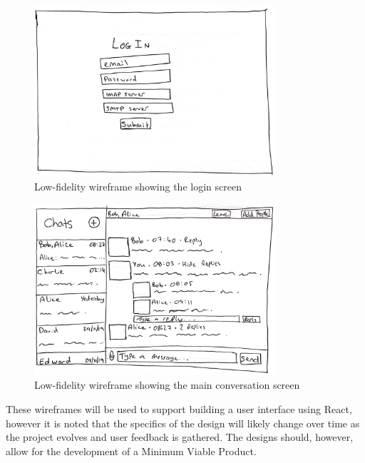 \begin{figure}[h!]
  \centering
  \includegraphics[width=0.8\textwidth]{images/login-design.png}
  \caption{Low-fidelity wireframe showing the login screen}
  \label{fig:sketch-login}
\end{figure}

\begin{figure}[h!]
  \centering
  \includegraphics[width=0.8\textwidth]{images/final-design.png}
  \caption{Low-fidelity wireframe showing the main conversation screen}
  \label{fig:sketch-main} 
\end{figure}


These wireframes will be used to support building a user interface using React, however it is noted that the specifics of the design will likely change over time as the project evolves and user feedback is gathered. The designs should, however, allow for the development of a Minimum Viable Product.